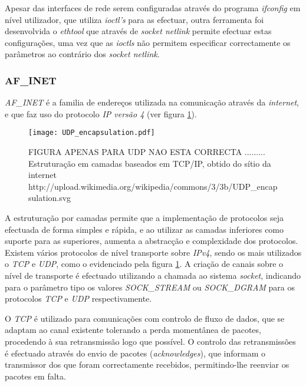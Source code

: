 Apesar das interfaces de rede serem configuradas através do programa \textit{ifconfig} em nível utilizador, que utiliza \textit{ioctl's} para as efectuar, outra ferramenta foi desenvolvida o \textit{ethtool} que através de \textit{socket netlink} permite efectuar estas configurações, uma vez que as \textit{ioctls} não permitem especificar correctamente os parâmetros ao contrário dos \textit{socket netlink}.


\subsubsection{AF\_INET}
\label{subsub:af_inet}

\textit{AF\_INET} é a familia de endereços utilizada na comunicação através da \textit{internet}, e que faz uso do protocolo \textit{IP versão 4} (ver figura \ref{fig:stack_tcp_ip}).

\begin{figure}[ht]
\centering
\texttt{[image: UDP\_encapsulation.pdf]}
\caption{FIGURA APENAS PARA UDP NAO ESTA CORRECTA ......... Estruturação em camadas baseados em TCP/IP, obtido do sítio da internet http://upload.wikimedia.org/wikipedia/commons/3/3b/UDP\_encapsulation.svg}
\label{fig:stack_tcp_ip}
\end{figure}


A estruturação por camadas permite que a implementação de protocolos seja efectuada de forma simples e rápida, e ao utilizar as camadas inferiores como suporte para as superiores, aumenta a abstracção e complexidade dos protocolos.
Existem vários protocolos de nível transporte sobre \textit{IPv4}, sendo os mais utilizados o \textit{TCP} e \textit{UDP}, como o evidenciado pela figura \ref{fig:stack_tcp_ip}.
A criação de canais sobre o nível de transporte é efectuado utilizando a chamada ao sistema \textit{socket}, indicando para o parâmetro tipo os valores \textit{SOCK\_STREAM} ou \textit{SOCK\_DGRAM} para os protocolos \textit{TCP} e \textit{UDP} respectivamente.

O \textit{TCP} é utilizado para comunicações com controlo de fluxo de dados, que se adaptam ao canal existente tolerando a perda momentânea de pacotes, procedendo à sua retransmissão logo que possível.
O controlo das retransmissões é efectuado através do envio de pacotes (\textit{acknowledges}), que informam o transmissor dos que foram correctamente recebidos, permitindo-lhe reenviar os pacotes em falta.

